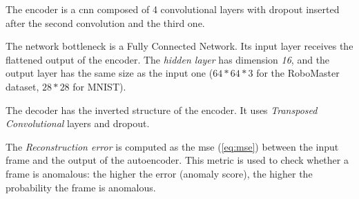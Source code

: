     The encoder is a \acrfull{cnn} composed of 4 convolutional layers with dropout inserted after the second convolution and the third one.
    
    
    The network bottleneck is a Fully Connected Network. Its input layer receives the flattened output of the encoder. The \emph{hidden layer} has dimension \emph{16}, and the output layer has the same size as the input one ($64*64*3$ for the RoboMaster dataset, $28*28$ for MNIST).
    
    
    The decoder has the inverted structure of the encoder. It uses \emph{Transposed Convolutional} layers and dropout.
    
    The \emph{Reconstruction error} is computed as the \acrfull{mse} (\autoref{eq:mse}) between the input frame and the output of the autoencoder. This metric is used to check whether a frame is anomalous: the higher the error (anomaly score), the higher the probability the frame is anomalous.
    
    
